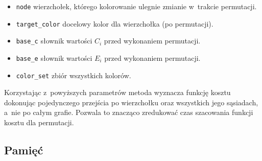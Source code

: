 \documentclass[a4paper,10pt]{article}
\begin{document}
\begin{itemize}
    \item \verb+node+ wierzchołek, którego kolorowanie ulegnie zmianie w~trakcie permutacji.
    \item \verb+target_color+ docelowy kolor dla wierzchołka (po permutacji).
    \item \verb+base_c+ słownik wartości $C_{i}$ przed wykonaniem permutacji.
    \item \verb+base_e+ słownik wartości $E_{i}$ przed wykonaniem permutacji.
    \item \verb+color_set+ zbiór wszystkich kolorów.
\end{itemize}

\noindent Korzystając z~powyższych parametrów metoda wyznacza funkcję kosztu dokonując pojedynczego przejścia po wierzchołku oraz wszystkich jego sąsiadach, a~nie po całym grafie. Pozwala to znacząco zredukować czas szacowania funkcji kosztu dla permutacji.

\subsection*{Pamięć}
\end{document}

